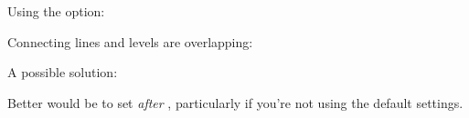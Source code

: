 \documentclass[load-preamble+]{cnltx-doc}
\begin{document}
\begin{example}
  \begin{endiagram}
    \ShowGain[connect={dotted,red},offset=2]
  \end{endiagram}
\end{example}

Using the  option:
\begin{example}
  \begin{endiagram}
     \ShowGain[label]
  \end{endiagram}
  \begin{endiagram}
    \ShowGain[label]
  \end{endiagram}
\end{example}

\begin{example}
  \begin{endiagram}
    \ShowGain[label=exothermic]
  \end{endiagram}
\end{example}

Connecting lines and levels are overlapping:
\begin{example}
  \begin{endiagram}
    \ShowNiveaus
    \ShowGain[connect=red]
  \end{endiagram}
\end{example}

A possible solution:
\begin{example}
  \begin{endiagram}
    \ShowNiveaus
    \ShowGain[connect-from-line,connect=red]
  \end{endiagram}
\end{example}

Better would be to set  \emph{after} ,
particularly if you're not using the default settings.
\begin{example}
  \begin{endiagram}
    \ShowNiveaus[niveau=N1-1]
    \ShowGain[connect={red,dotted}]
  \end{endiagram}
  \begin{endiagram}
    \ShowGain[connect={red,dotted}]
    \ShowNiveaus[niveau=N1-1]
  \end{endiagram}
\end{example}
\end{document}
